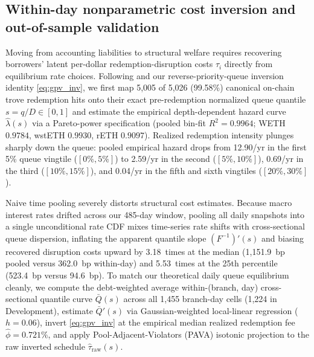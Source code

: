 \subsection{Within-day nonparametric cost inversion and out-of-sample validation}\label{subsec:gpv}

Moving from accounting liabilities to structural welfare requires recovering borrowers' latent per-dollar redemption-disruption costs $\tau_i$ directly from equilibrium rate choices. Following \citet{guerre2000optimal} and our reverse-priority-queue inversion identity \eqref{eq:gpv_inv}, we first map 5,005 of 5,026 (99.58\%) canonical on-chain trove redemption hits onto their exact pre-redemption normalized queue quantile $s = q/D \in [0, 1]$ and estimate the empirical depth-dependent hazard curve $\hat{\lambda}(s)$ via a Pareto-power specification (pooled bin-fit $R^2 = 0.9964$; WETH $0.9784$, wstETH $0.9930$, rETH $0.9097$). Realized redemption intensity plunges sharply down the queue: pooled empirical hazard drops from 12.90/yr in the first 5\% queue vingtile ($[0\%, 5\%]$) to 2.59/yr in the second ($[5\%, 10\%]$), 0.69/yr in the third ($[10\%, 15\%]$), and 0.04/yr in the fifth and sixth vingtiles ($[20\%, 30\%]$).

Naive time pooling severely distorts structural cost estimates. Because macro interest rates drifted across our 485-day window, pooling all daily snapshots into a single unconditional rate CDF mixes time-series rate shifts with cross-sectional queue dispersion, inflating the apparent quantile slope $(F^{-1})'(s)$ and biasing recovered disruption costs upward by 3.18~times at the median (1,151.9~bp pooled versus 362.0~bp within-day) and 5.53~times at the 25th percentile (523.4~bp versus 94.6~bp). To match our theoretical daily queue equilibrium cleanly, we compute the debt-weighted average within-(branch, day) cross-sectional quantile curve $\bar{Q}(s)$ across all 1,455 branch-day cells (1,224 in Development), estimate $\bar{Q}'(s)$ via Gaussian-weighted local-linear regression ($h = 0.06$), invert \eqref{eq:gpv_inv} at the empirical median realized redemption fee $\hat{\phi} = 0.721\%$, and apply Pool-Adjacent-Violators (PAVA) isotonic projection to the raw inverted schedule $\hat{\tau}_{\text{raw}}(s)$.

